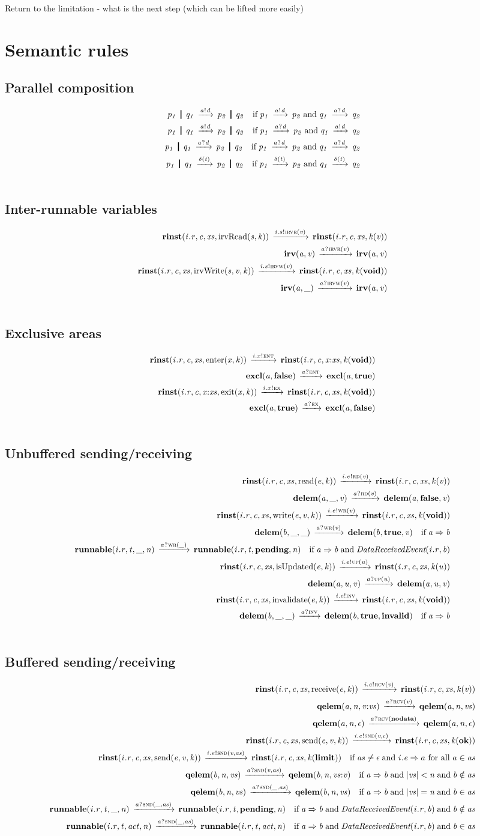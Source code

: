 \documentclass[10pt,conference]{IEEEtran}
\begin{document}
Return to the limitation - what is the next step (which can be lifted more easily)



\onecolumn
\appendix
\section{Semantic rules}
\label{sec:Rules}

\setcounter{equation}{0}

\subsection{Parallel composition}
{
\renewcommand{\Prule}[2]{#1 \quad \Pif\; #2\\}
\renewcommand{\Tstep}[3]{#1 \red{#2} #3}
\renewcommand\Pcomma{\;\text{and}\;}

\begin{eqnarray}  \CombRed  \notag \end{eqnarray}
}

\subsection{Inter-runnable variables}
\begin{eqnarray}      \InterrunnableVariables  \notag \end{eqnarray}

\subsection{Exclusive areas}
\begin{eqnarray}      \ExclusiveAreas          \notag \end{eqnarray}

\subsection{Unbuffered sending/receiving}
\begin{eqnarray}      \ReadingWriting          \notag \end{eqnarray}

\subsection{Buffered sending/receiving}
\begin{eqnarray}      \SendingReceiving        \notag \end{eqnarray}
\end{document}
